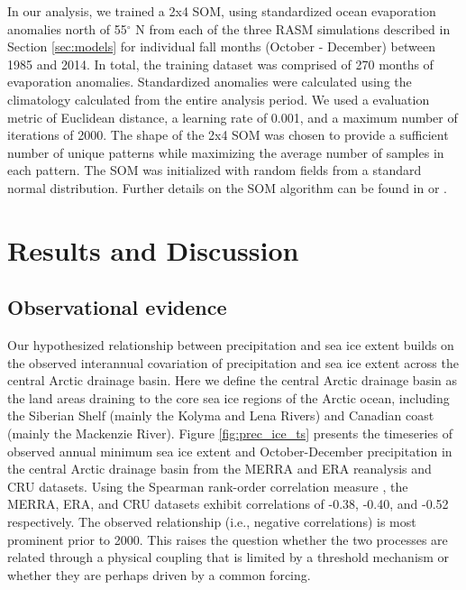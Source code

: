 In our analysis, we trained a 2x4 SOM, using standardized ocean evaporation anomalies north of 55$^{\circ}$ N from each of the three RASM simulations described in Section \ref{sec:models} for individual fall months (October - December) between 1985 and 2014.
In total, the training dataset was comprised of 270 months of evaporation anomalies.
Standardized anomalies were calculated using the climatology calculated from the entire analysis period.
We used a evaluation metric of Euclidean distance, a learning rate of 0.001, and a maximum number of iterations of 2000.
The shape of the 2x4 SOM was chosen to provide a sufficient number of unique patterns while maximizing the average number of samples in each pattern.
The SOM was initialized with random fields from a standard normal distribution. %
Further details on the SOM algorithm can be found in \citet{Reusch_2005} or \citet{Cassano_2015}.

\section{Results and Discussion}
\label{sec:results_ch5}
\subsection{Observational evidence}
Our hypothesized relationship between precipitation and sea ice extent builds on the observed interannual covariation of precipitation and sea ice extent across the central Arctic drainage basin.
Here we define the central Arctic drainage basin as the land areas draining to the core sea ice regions of the Arctic ocean, including the Siberian Shelf (mainly the Kolyma and Lena Rivers) and Canadian coast (mainly the Mackenzie River).
Figure \ref{fig:prec_ice_ts} presents the timeseries of observed annual minimum sea ice extent and October-December precipitation in the central Arctic drainage basin from the MERRA and ERA reanalysis and CRU datasets.
Using the Spearman rank-order correlation measure \citep{Spearman_1904}, the MERRA, ERA, and CRU datasets exhibit correlations of -0.38, -0.40, and -0.52 respectively.
The observed relationship (i.e., negative correlations) is most prominent prior to 2000.
This raises the question whether the two processes are related through a physical coupling that is limited by a threshold mechanism or whether they are perhaps driven by a common forcing.

